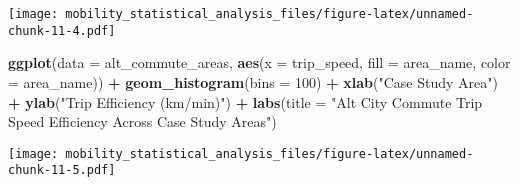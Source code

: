 \documentclass[
]{article}
\newenvironment{Shaded}{\begin{snugshade}}{\end{snugshade}}
\newcommand{\AttributeTok}[1]{\textcolor[rgb]{0.13,0.29,0.53}{#1}}
\newcommand{\DecValTok}[1]{\textcolor[rgb]{0.00,0.00,0.81}{#1}}
\newcommand{\FunctionTok}[1]{\textcolor[rgb]{0.13,0.29,0.53}{\textbf{#1}}}
\newcommand{\NormalTok}[1]{#1}
\newcommand{\SpecialCharTok}[1]{\textcolor[rgb]{0.81,0.36,0.00}{\textbf{#1}}}
\newcommand{\StringTok}[1]{\textcolor[rgb]{0.31,0.60,0.02}{#1}}
\begin{document}
\texttt{[image: mobility\_statistical\_analysis\_files/figure-latex/unnamed-chunk-11-4.pdf]}

\begin{Shaded}
\begin{Highlighting}[]
\FunctionTok{ggplot}\NormalTok{(}\AttributeTok{data =}\NormalTok{ alt\_commute\_areas, }\FunctionTok{aes}\NormalTok{(}\AttributeTok{x =}\NormalTok{ trip\_speed, }\AttributeTok{fill =}\NormalTok{ area\_name, }\AttributeTok{color =}\NormalTok{ area\_name)) }\SpecialCharTok{+} 
  \FunctionTok{geom\_histogram}\NormalTok{(}\AttributeTok{bins =} \DecValTok{100}\NormalTok{) }\SpecialCharTok{+} 
  \FunctionTok{xlab}\NormalTok{(}\StringTok{"Case Study Area"}\NormalTok{) }\SpecialCharTok{+} 
  \FunctionTok{ylab}\NormalTok{(}\StringTok{"Trip Efficiency (km/min)"}\NormalTok{) }\SpecialCharTok{+} 
  \FunctionTok{labs}\NormalTok{(}\AttributeTok{title =} \StringTok{"Alt City Commute Trip Speed Efficiency Across Case Study Areas"}\NormalTok{) }
\end{Highlighting}
\end{Shaded}

\texttt{[image: mobility\_statistical\_analysis\_files/figure-latex/unnamed-chunk-11-5.pdf]}
\end{document}
